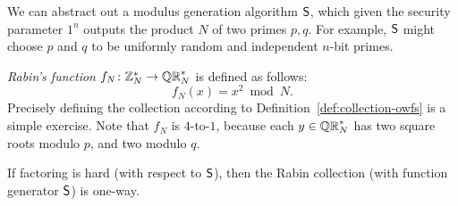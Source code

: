 \documentclass[11pt]{article}
\begin{document}
We can abstract out a modulus generation algorithm $\mathsf{S}$, which
given the security parameter $1^{n}$ outputs the product $N$ of two
primes $p,q$.  For example, $\mathsf{S}$ might choose $p$ and $q$ to be
uniformly random and independent $n$-bit primes.

\emph{Rabin's function} $f_{N} \colon \mathbb{Z}_N^{*} \to \mathbb{QR}_{N}^{*}$ is defined
as follows: \[ f_{N}(x) = x^{2} \bmod N. \] Precisely defining the
collection according to Definition~\ref{def:collection-owfs} is a
simple exercise.  Note that $f_{N}$ is $4$-to-$1$, because each $y \in
\mathbb{QR}_{N}^{*}$ has two square roots modulo $p$, and two modulo $q$.

\begin{theorem}
  \label{thm:rabin-owf-factor}
  If factoring is hard (with respect to $\mathsf{S}$), then the Rabin
  collection (with function generator $\mathsf{S}$) is one-way.
\end{theorem}
\end{document}
